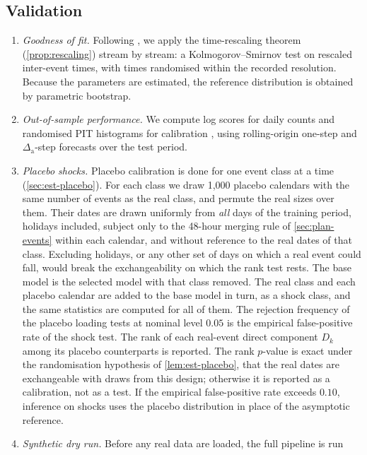 \subsection{Validation}\label{sec:plan-validation}

\begin{enumerate}[V1.]
  \item \emph{Goodness of fit.} Following \citet{brown2002}, we apply the
  time-rescaling theorem (\cref{prop:rescaling}) stream by stream: a
  Kolmogorov--Smirnov test on rescaled inter-event times, with times
  randomised within the recorded resolution. Because the parameters are
  estimated, the reference distribution is obtained by parametric
  bootstrap.
  \item \emph{Out-of-sample performance.} We compute log scores for daily
  counts \citep{gneiting2007} and randomised PIT histograms for calibration
  \citep{dawid1984,gneiting2007b}, using rolling-origin one-step and
  $\Delta_{\mathrm a}$-step forecasts over the test period.
  \item \emph{Placebo shocks.} Placebo calibration is done for one event class at a time
  (\cref{sec:est-placebo}). For each class we draw 1{,}000 placebo calendars with the same
  number of events as the real class, and permute the real sizes over them. Their dates are
  drawn uniformly from \emph{all} days of the training period, holidays included, subject
  only to the 48-hour merging rule of \cref{sec:plan-events} within each calendar, and
  without reference to the real dates of that class. Excluding holidays, or any other set of
  days on which a real event could fall, would break the exchangeability on which the rank
  test rests. The base model is the selected model with that class removed. The real class
  and each placebo calendar are added to the base model in turn, as a shock class, and the
  same statistics are computed for all of them. The rejection frequency of the placebo
  loading tests at nominal level $0.05$ is the empirical false-positive rate of the shock
  test. The rank of each real-event direct component $D_k$ among its placebo counterparts is
  reported. The rank $p$-value is exact under the randomisation hypothesis of
  \cref{lem:est-placebo}, that the real dates are exchangeable with draws from this design;
  otherwise it is reported as a calibration, not as a test. If the empirical
  false-positive rate exceeds $0.10$, inference on shocks uses the placebo distribution in
  place of the asymptotic reference.
  \item \emph{Synthetic dry run.} Before any real data are loaded, the full pipeline is run

\end{enumerate}
